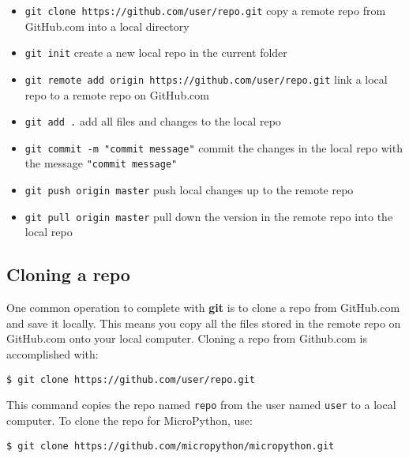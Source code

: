 \documentclass{book}
\newcommand{\passthrough}[1]{#1}
\begin{document}
\begin{itemize}
\item
  \passthrough{\lstinline!git clone https://github.com/user/repo.git!}
  copy a remote repo from GitHub.com into a local directory
\item
  \passthrough{\lstinline!git init!} create a new local repo in the
  current folder
\item
  \passthrough{\lstinline!git remote add origin https://github.com/user/repo.git!}
  link a local repo to a remote repo on GitHub.com
\item
  \passthrough{\lstinline!git add .!} add all files and changes to the
  local repo
\item
  \passthrough{\lstinline!git commit -m "commit message"!} commit the
  changes in the local repo with the message
  \passthrough{\lstinline!"commit message"!}
\item
  \passthrough{\lstinline!git push origin master!} push local changes up
  to the remote repo
\item
  \passthrough{\lstinline!git pull origin master!} pull down the version
  in the remote repo into the local repo
\end{itemize}
    




    
        \hypertarget{cloning-a-repo}{%
\subsection{Cloning a repo}\label{cloning-a-repo}}
    




    
        One common operation to complete with \textbf{git} is to clone a repo
from GitHub.com and save it locally. This means you copy all the files
stored in the remote repo on GitHub.com onto your local computer.
Cloning a repo from Github.com is accomplished with:

\begin{lstlisting}
$ git clone https://github.com/user/repo.git
\end{lstlisting}

This command copies the repo named \passthrough{\lstinline!repo!} from
the user named \passthrough{\lstinline!user!} to a local computer. To
clone the repo for MicroPython, use:

\begin{lstlisting}
$ git clone https://github.com/micropython/micropython.git
\end{lstlisting}
    
\end{document}
